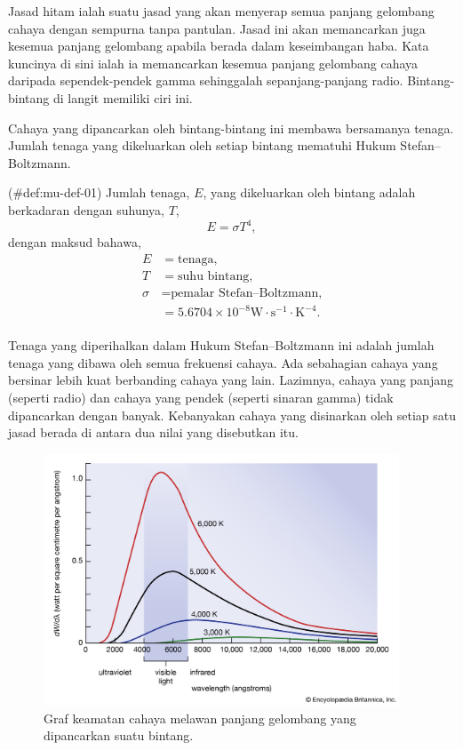 \documentclass[
]{book}
\begin{document}
Jasad hitam ialah suatu jasad yang akan menyerap semua panjang gelombang
cahaya dengan sempurna tanpa pantulan. Jasad ini akan memancarkan juga
kesemua panjang gelombang apabila berada dalam keseimbangan haba. Kata
kuncinya di sini ialah ia memancarkan kesemua panjang gelombang cahaya
daripada sependek-pendek gamma sehinggalah sepanjang-panjang radio.
Bintang-bintang di langit memiliki ciri ini.

Cahaya yang dipancarkan oleh bintang-bintang ini membawa bersamanya
tenaga. Jumlah tenaga yang dikeluarkan oleh setiap bintang mematuhi
Hukum Stefan--Boltzmann.

\BeginKnitrBlock{definition}{}

\protect\hypertarget{def:mu-def-01}{}{(\#def:mu-def-01) {} }Jumlah tenaga, \(E\), yang dikeluarkan oleh
bintang adalah berkadaran dengan suhunya, \(T\), \begin{equation}
  E = \sigma T^4,
\end{equation} dengan maksud bahawa, \begin{equation*}
\begin{split}
    E & = \text{tenaga},\\
    T & = \text{suhu bintang},\\
    \sigma & = \text{pemalar Stefan--Boltzmann,}\\
    & = 5.6704\times 10^{-8}\text{W}\cdot\text{s}^{-1}\cdot\text{K}^{-4}.\\
\end{split}
\end{equation*} 

Tenaga yang diperihalkan dalam Hukum Stefan--Boltzmann ini adalah jumlah
tenaga yang dibawa oleh semua frekuensi cahaya. Ada sebahagian cahaya
yang bersinar lebih kuat berbanding cahaya yang lain. Lazimnya, cahaya
yang panjang (seperti radio) dan cahaya yang pendek (seperti sinaran
gamma) tidak dipancarkan dengan banyak. Kebanyakan cahaya yang
disinarkan oleh setiap satu jasad berada di antara dua nilai yang
disebutkan itu.

\begin{figure}
\includegraphics[width=400px]{./gambar/ultra/jasadhitam} \caption{Graf keamatan cahaya melawan panjang gelombang yang dipancarkan suatu bintang.}\label{fig:mu-jasad}
\end{figure}
\end{document}
